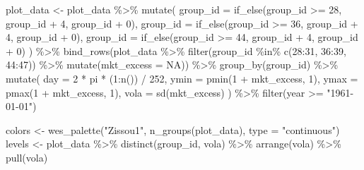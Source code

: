 \documentclass[
]{krantz}
\newenvironment{Shaded}{\begin{snugshade}}{\end{snugshade}}
\newcommand{\AttributeTok}[1]{\textcolor[rgb]{0.61,0.61,0.61}{#1}}
\newcommand{\ConstantTok}[1]{\textcolor[rgb]{0,0,0}{#1}}
\newcommand{\DecValTok}[1]{\textcolor[rgb]{0.06,0.06,0.06}{#1}}
\newcommand{\FunctionTok}[1]{\textcolor[rgb]{0,0,0}{#1}}
\newcommand{\NormalTok}[1]{#1}
\newcommand{\OtherTok}[1]{\textcolor[rgb]{0.37,0.37,0.37}{#1}}
\newcommand{\SpecialCharTok}[1]{\textcolor[rgb]{0,0,0}{#1}}
\newcommand{\StringTok}[1]{\textcolor[rgb]{0.5,0.5,0.5}{#1}}
\begin{document}
\begin{Shaded}
\begin{Highlighting}[]
\NormalTok{plot\_data }\OtherTok{\textless{}{-}}\NormalTok{ plot\_data }\SpecialCharTok{\%\textgreater{}\%}
  \FunctionTok{mutate}\NormalTok{(}
    \AttributeTok{group\_id =} \FunctionTok{if\_else}\NormalTok{(group\_id }\SpecialCharTok{\textgreater{}=} \DecValTok{28}\NormalTok{, group\_id }\SpecialCharTok{+} \DecValTok{4}\NormalTok{, group\_id }\SpecialCharTok{+} \DecValTok{0}\NormalTok{),}
    \AttributeTok{group\_id =} \FunctionTok{if\_else}\NormalTok{(group\_id }\SpecialCharTok{\textgreater{}=} \DecValTok{36}\NormalTok{, group\_id }\SpecialCharTok{+} \DecValTok{4}\NormalTok{, group\_id }\SpecialCharTok{+} \DecValTok{0}\NormalTok{),}
    \AttributeTok{group\_id =} \FunctionTok{if\_else}\NormalTok{(group\_id }\SpecialCharTok{\textgreater{}=} \DecValTok{44}\NormalTok{, group\_id }\SpecialCharTok{+} \DecValTok{4}\NormalTok{, group\_id }\SpecialCharTok{+} \DecValTok{0}\NormalTok{)}
\NormalTok{  ) }\SpecialCharTok{\%\textgreater{}\%}
  \FunctionTok{bind\_rows}\NormalTok{(plot\_data }\SpecialCharTok{\%\textgreater{}\%}
    \FunctionTok{filter}\NormalTok{(group\_id }\SpecialCharTok{\%in\%} \FunctionTok{c}\NormalTok{(}\DecValTok{28}\SpecialCharTok{:}\DecValTok{31}\NormalTok{, }\DecValTok{36}\SpecialCharTok{:}\DecValTok{39}\NormalTok{, }\DecValTok{44}\SpecialCharTok{:}\DecValTok{47}\NormalTok{)) }\SpecialCharTok{\%\textgreater{}\%}
    \FunctionTok{mutate}\NormalTok{(}\AttributeTok{mkt\_excess =} \ConstantTok{NA}\NormalTok{)) }\SpecialCharTok{\%\textgreater{}\%}
  \FunctionTok{group\_by}\NormalTok{(group\_id) }\SpecialCharTok{\%\textgreater{}\%}
  \FunctionTok{mutate}\NormalTok{(}
    \AttributeTok{day =} \DecValTok{2} \SpecialCharTok{*}\NormalTok{ pi }\SpecialCharTok{*}\NormalTok{ (}\DecValTok{1}\SpecialCharTok{:}\FunctionTok{n}\NormalTok{()) }\SpecialCharTok{/} \DecValTok{252}\NormalTok{,}
    \AttributeTok{ymin =} \FunctionTok{pmin}\NormalTok{(}\DecValTok{1} \SpecialCharTok{+}\NormalTok{ mkt\_excess, }\DecValTok{1}\NormalTok{),}
    \AttributeTok{ymax =} \FunctionTok{pmax}\NormalTok{(}\DecValTok{1} \SpecialCharTok{+}\NormalTok{ mkt\_excess, }\DecValTok{1}\NormalTok{),}
    \AttributeTok{vola =} \FunctionTok{sd}\NormalTok{(mkt\_excess)}
\NormalTok{  ) }\SpecialCharTok{\%\textgreater{}\%}
  \FunctionTok{filter}\NormalTok{(year }\SpecialCharTok{\textgreater{}=} \StringTok{"1961{-}01{-}01"}\NormalTok{)}

\NormalTok{colors }\OtherTok{\textless{}{-}} \FunctionTok{wes\_palette}\NormalTok{(}\StringTok{"Zissou1"}\NormalTok{, }\FunctionTok{n\_groups}\NormalTok{(plot\_data), }\AttributeTok{type =} \StringTok{"continuous"}\NormalTok{)}
\NormalTok{levels }\OtherTok{\textless{}{-}}\NormalTok{ plot\_data }\SpecialCharTok{\%\textgreater{}\%}
  \FunctionTok{distinct}\NormalTok{(group\_id, vola) }\SpecialCharTok{\%\textgreater{}\%}
  \FunctionTok{arrange}\NormalTok{(vola) }\SpecialCharTok{\%\textgreater{}\%}
  \FunctionTok{pull}\NormalTok{(vola)}


\end{Highlighting}
\end{Shaded}
\end{document}
